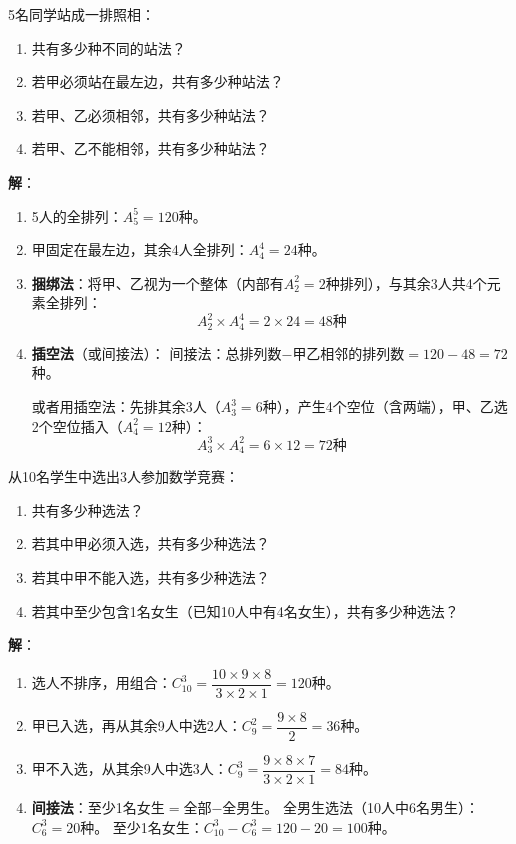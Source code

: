 \documentclass[12pt, a4paper]{ctexart}
\begin{document}
\begin{examplebox}
5名同学站成一排照相：
\begin{enumerate}[label=(\arabic*)]
  \item 共有多少种不同的站法？
  \item 若甲必须站在最左边，共有多少种站法？
  \item 若甲、乙必须相邻，共有多少种站法？
  \item 若甲、乙不能相邻，共有多少种站法？
\end{enumerate}

\textbf{解}：
\begin{enumerate}[label=(\arabic*)]
  \item 5人的全排列：$A_5^5 = 120$种。

  \item 甲固定在最左边，其余4人全排列：$A_4^4 = 24$种。

  \item \textbf{捆绑法}：将甲、乙视为一个整体（内部有$A_2^2 = 2$种排列），与其余3人共4个元素全排列：
  \[
  A_2^2 \times A_4^4 = 2 \times 24 = 48 \text{种}
  \]

  \item \textbf{插空法}（或间接法）：
  间接法：总排列数$-$甲乙相邻的排列数$= 120 - 48 = 72$种。

  或者用插空法：先排其余3人（$A_3^3 = 6$种），产生4个空位（含两端），甲、乙选2个空位插入（$A_4^2 = 12$种）：
  \[
  A_3^3 \times A_4^2 = 6 \times 12 = 72 \text{种}
  \]
\end{enumerate}
\end{examplebox}

\begin{examplebox}
从10名学生中选出3人参加数学竞赛：
\begin{enumerate}[label=(\arabic*)]
  \item 共有多少种选法？
  \item 若其中甲必须入选，共有多少种选法？
  \item 若其中甲不能入选，共有多少种选法？
  \item 若其中至少包含1名女生（已知10人中有4名女生），共有多少种选法？
\end{enumerate}

\textbf{解}：
\begin{enumerate}[label=(\arabic*)]
  \item 选人不排序，用组合：$C_{10}^3 = \dfrac{10 \times 9 \times 8}{3 \times 2 \times 1} = 120$种。

  \item 甲已入选，再从其余9人中选2人：$C_9^2 = \dfrac{9 \times 8}{2} = 36$种。

  \item 甲不入选，从其余9人中选3人：$C_9^3 = \dfrac{9 \times 8 \times 7}{3 \times 2 \times 1} = 84$种。

  \item \textbf{间接法}：至少1名女生$=$全部$-$全男生。
  全男生选法（10人中6名男生）：$C_6^3 = 20$种。
  至少1名女生：$C_{10}^3 - C_6^3 = 120 - 20 = 100$种。
\end{enumerate}
\end{examplebox}
\end{document}
